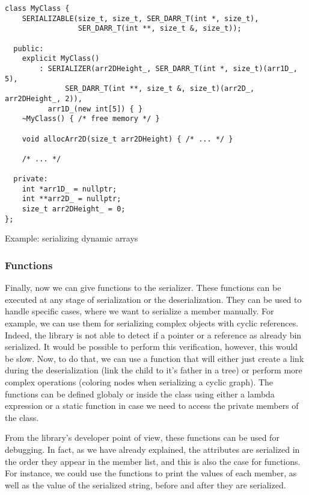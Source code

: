 \begin{listing}[ht!]
\begin{verbatim}
class MyClass {
    SERIALIZABLE(size_t, size_t, SER_DARR_T(int *, size_t),
                 SER_DARR_T(int **, size_t &, size_t));

  public:
    explicit MyClass()
        : SERIALIZER(arr2DHeight_, SER_DARR_T(int *, size_t)(arr1D_, 5),
              SER_DARR_T(int **, size_t &, size_t)(arr2D_, arr2DHeight_, 2)),
          arr1D_(new int[5]) { }
    ~MyClass() { /* free memory */ }

    void allocArr2D(size_t arr2DHeight) { /* ... */ }

    /* ... */

  private:
    int *arr1D_ = nullptr;
    int **arr2D_ = nullptr;
    size_t arr2DHeight_ = 0;
};
\end{verbatim}
\caption{Example: serializing dynamic arrays}
\label{lst:serdynamicarr}
\end{listing}

\subsubsection{Functions}

Finally, now we can give functions to the serializer. These functions can be
executed at any stage of serialization or the deserialization. They can be used
to handle specific cases, where we want to serialize a member manually. For
example, we can use them for serializing complex objects with cyclic references.
Indeed, the library is not able to detect if a pointer or a reference as already
bin serialized. It would be possible to perform this verification, however, this
would be slow. Now, to do that, we can use a function that will either just
create a link during the deserialization (link the child to it's father in a
tree) or perform more complex operations (coloring nodes when serializing a
cyclic graph). The functions can be defined globaly or inside the class using
either a lambda expression or a static function in case we need to access the
private members of the class.

From the library's developer point of view, these functions can be used for
debugging. In fact, as we have already explained, the attributes are serialized
in the order they appear in the member list, and this is also the case for
functions. For instance, we could use the functions to print the values of each
member, as well as the value of the serialized string, before and after they are
serialized.


